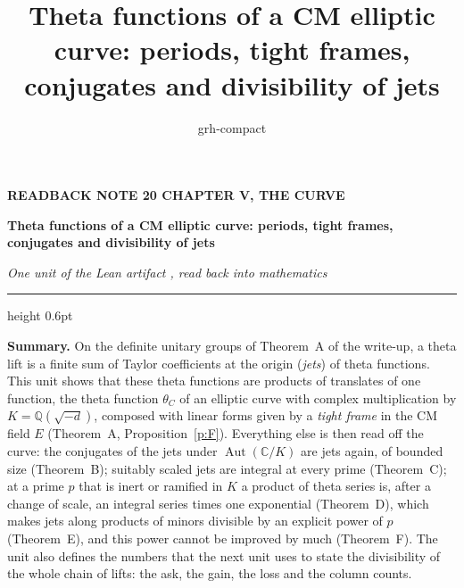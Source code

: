 \documentclass[11pt,a4paper]{article}
\title{Theta functions of a CM elliptic curve: periods, tight frames, conjugates and divisibility of jets}
\author{grh-compact}
\date{}
\newcommand{\Q}{\mathbb{Q}}
\theoremstyle{plainx}
\theoremstyle{uprightx}
\newcommand{\CC}{\mathbb{C}}
\newcommand{\Aut}{\operatorname{Aut}}
\newcommand{\thC}[1]{\theta_{#1}}
\begin{document}
\color{ink}

{\raggedright
{\sffamily\bfseries\fontsize{7.2}{9}\selectfont\color{leancol}READBACK NOTE 20 \textperiodcentered{} CHAPTER V, THE CURVE\par}
\vspace{5pt}
{\fontsize{21.5}{25.5}\selectfont\bfseries Theta functions of a CM elliptic curve: periods, tight frames, conjugates and divisibility of jets\par}
\vspace{5pt}
{\fontsize{12.4}{16}\selectfont\itshape\color{inksoft} One unit of the Lean artifact \ArtifactName, read back into
mathematics\par}}
\vspace{8pt}
{\color{rulegrey}\hrule height 0.6pt}
\vspace{7pt}
\thispagestyle{empty}

\textbf{Summary.} On the definite unitary groups of Theorem~A of the write-up, a theta lift is a finite sum of
Taylor coefficients at the origin (\emph{jets}) of theta functions. This unit shows that these theta functions are
products of translates of one function, the theta function $\thC{C}$ of an elliptic curve with complex multiplication
by $K=\Q(\sqrt{-d})$, composed with linear forms given by a \emph{tight frame} in the CM field $E$ (Theorem~A,
Proposition~\ref{p:F}). Everything else is then read off the curve: the conjugates of the jets under
$\Aut(\CC/K)$ are jets again, of bounded size (Theorem~B); suitably scaled jets are integral at every prime
(Theorem~C); at a prime $p$ that is inert or ramified in $K$ a product of theta series is, after a change of scale,
an integral series times one exponential (Theorem~D), which makes jets along products of minors divisible by an
explicit power of $p$ (Theorem~E), and this power cannot be improved by much (Theorem~F). The unit also defines the
numbers that the next unit uses to state the divisibility of the whole chain of lifts: the ask, the gain, the loss
and the column counts.
\end{document}
